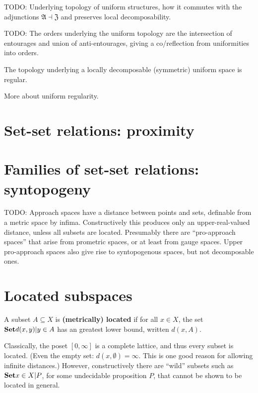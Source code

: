 \documentclass{article}
\def\Rp{[0,\infty]}
\def\anti{\mathfrak{A}}
\def\neigh{\mathfrak{Z}}
\begin{document}
\begin{thm}
  TODO: Underlying topology of uniform structures, how it commutes with the adjunctions $\anti\dashv \neigh$ and preserves local decomposability.
\end{thm}

\begin{thm}
  TODO: The orders underlying the uniform topology are the intersection of entourages and union of anti-entourages, giving a co/reflection from uniformities into orders.
\end{thm}

\begin{thm}
  The topology underlying a locally decomposable (symmetric) uniform space is regular.
\end{thm}

More about uniform regularity.



\section{Set-set relations: proximity}
\label{sec:set-set}
\label{sec:proximity}



\section{Families of set-set relations: syntopogeny}
\label{sec:syntopogeny}

TODO: Approach spaces have a distance between points and sets, definable from a metric space by infima.
Constructively this produces only an upper-real-valued distance, unless all subsets are located.
Presumably there are ``pro-approach spaces'' that arise from prometric spaces, or at least from gauge spaces.
Upper pro-approach spaces also give rise to syntopogenous spaces, but not decomposable ones.



\section{Located subspaces}
\label{sec:located}

\begin{defn}
  A subset $A\subseteq X$ is \textbf{(metrically) located} if for all $x\in X$, the set $\setof{ d(x,y) | y\in A }$ has an greatest lower bound, written $d(x,A)$.
\end{defn}

Classically, the poset $\Rp$ is a complete lattice, and thus every subset is located.
(Even the empty set: $d(x,\emptyset)=\infty$.
This is one good reason for allowing infinite distances.)
However, constructively there are ``wild'' subsets such as $\setof{x\in X | P}$, for some undecidable proposition $P$, that cannot be shown to be located in general.




\end{document}
